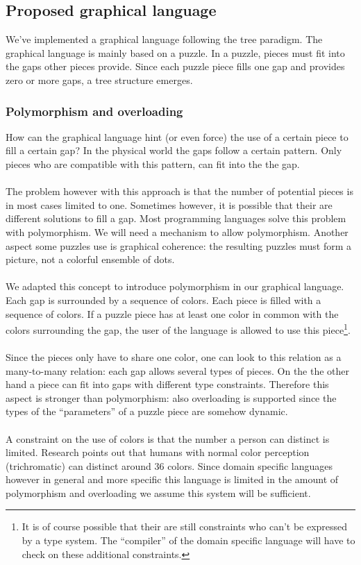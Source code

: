 \subsection{Proposed graphical language}
We've implemented a graphical language following the tree paradigm. The
graphical language is mainly based on a puzzle. In a puzzle, pieces must fit
into the gaps other pieces provide. Since each puzzle piece fills one gap and
provides zero or more gaps, a tree structure emerges.
\subsubsection{Polymorphism and overloading}
How can the graphical language hint (or even force) the use of a certain piece
to fill a certain gap? In the physical world the gaps follow a certain pattern.
Only pieces who are compatible with this pattern, can fit into the the gap.
\paragraph{}
The problem however with this approach is that the number of potential pieces
is in most cases limited to one. Sometimes however, it is possible that their
are different solutions to fill a gap. Most programming languages solve this
problem with polymorphism. We will need a mechanism to allow polymorphism.
Another aspect some puzzles use is graphical coherence: the resulting puzzles
must form a picture, not a colorful ensemble of dots.
\paragraph{}
We adapted this concept to introduce polymorphism in our graphical language.
Each gap is surrounded by a sequence of colors. Each piece is filled with a
sequence of colors. If a puzzle piece has at least one color in common with the
colors surrounding the gap, the user of the language is allowed to use this
piece\footnote{It is of course possible that their are still constraints who
can't be expressed by a type system. The ``compiler'' of the domain specific
language will have to check on these additional constraints.}.
\paragraph{}
Since the pieces only have to share one color, one can look to this relation as
a many-to-many relation: each gap allows several types of pieces. On the the
other hand a piece can fit into gaps with different type constraints. Therefore
this aspect is stronger than polymorphism: also overloading is supported since
the types of the ``parameters'' of a puzzle piece are somehow dynamic.
\paragraph{}
A constraint on the use of colors is that the number a person can distinct is
limited. Research points out that humans with normal color perception
(trichromatic) can distinct around 36 colors. Since domain specific languages
however in general and more specific this language is limited in the amount of
polymorphism and overloading we assume this system will be sufficient.